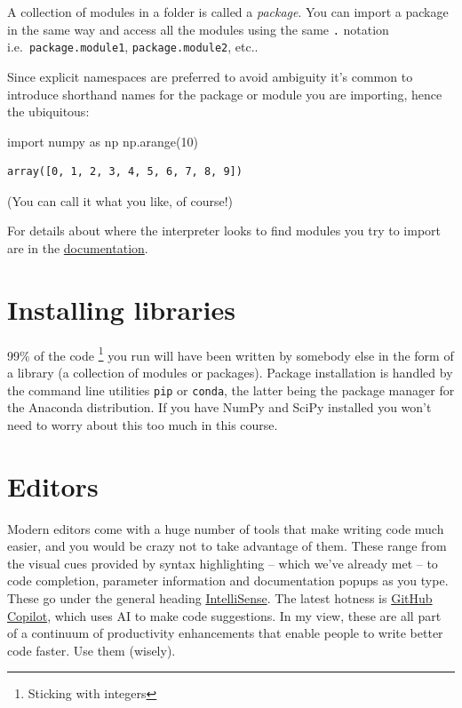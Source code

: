 \documentclass[
  letterpaper,
  DIV=11,
  numbers=noendperiod]{scrreprt}
\newenvironment{Shaded}{\begin{snugshade}}{\end{snugshade}}
\newcommand{\DecValTok}[1]{\textcolor[rgb]{0.68,0.00,0.00}{#1}}
\newcommand{\ImportTok}[1]{\textcolor[rgb]{0.00,0.46,0.62}{#1}}
\newcommand{\NormalTok}[1]{\textcolor[rgb]{0.00,0.23,0.31}{#1}}
\theoremstyle{definition}
\theoremstyle{remark}
\begin{document}
A collection of modules in a folder is called a \emph{package}. You can
import a package in the same way and access all the modules using the
same \texttt{.} notation i.e.~\texttt{package.module1},
\texttt{package.module2}, etc..

Since explicit namespaces are preferred to avoid ambiguity it's common
to introduce shorthand names for the package or module you are
importing, hence the ubiquitous:

\begin{Shaded}
\begin{Highlighting}[]
\ImportTok{import}\NormalTok{ numpy }\ImportTok{as}\NormalTok{ np}
\NormalTok{np.arange(}\DecValTok{10}\NormalTok{)}
\end{Highlighting}
\end{Shaded}

\begin{verbatim}
array([0, 1, 2, 3, 4, 5, 6, 7, 8, 9])
\end{verbatim}

(You can call it what you like, of course!)

For details about where the interpreter looks to find modules you try to
import are in the
\href{https://docs.python.org/3/tutorial/modules.html}{documentation}.

\hypertarget{installing-libraries}{%
\section{Installing libraries}\label{installing-libraries}}

99\% of the code \footnote{Sticking with integers} you run will have
been written by somebody else in the form of a library (a collection of
modules or packages). Package installation is handled by the command
line utilities \texttt{pip} or \texttt{conda}, the latter being the
package manager for the Anaconda distribution. If you have NumPy and
SciPy installed you won't need to worry about this too much in this
course.

\hypertarget{editors}{%
\section{Editors}\label{editors}}

Modern editors come with a huge number of tools that make writing code
much easier, and you would be crazy not to take advantage of them. These
range from the visual cues provided by syntax highlighting -- which
we've already met -- to code completion, parameter information and
documentation popups as you type. These go under the general heading
\href{https://code.visualstudio.com/docs/editor/intellisense}{IntelliSense}.
The latest hotness is \href{https://github.com/features/copilot}{GitHub
Copilot}, which uses AI to make code suggestions. In my view, these are
all part of a continuum of productivity enhancements that enable people
to write better code faster. Use them (wisely).
\end{document}
